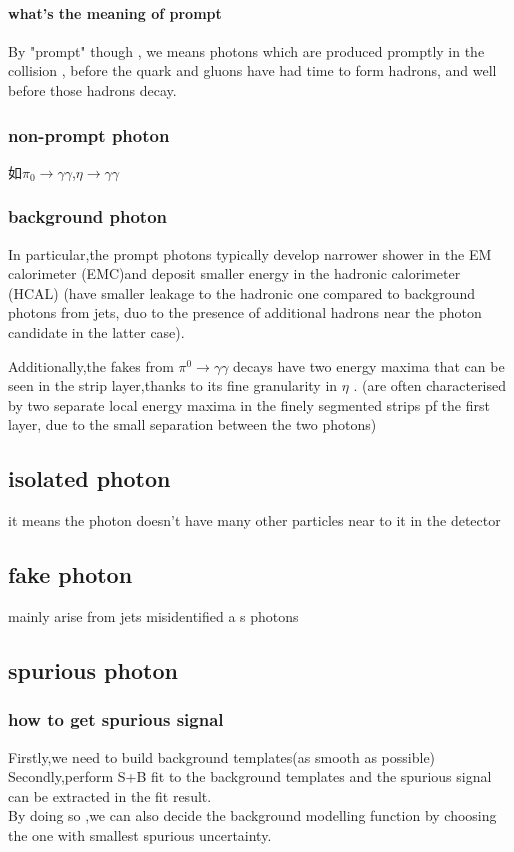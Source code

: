 \documentclass{ctexart}
\begin{document}
\paragraph{what's the meaning of prompt}
By "prompt" though , we means photons which are produced promptly in the collision , before the quark and gluons have had time to form hadrons, and well before those hadrons decay.
\subsubsection{non-prompt photon }
如$\pi_0\rightarrow \gamma\gamma$,$\eta\rightarrow\gamma\gamma$
\subsubsection{background photon}
In particular,the prompt photons typically develop narrower shower in the EM calorimeter (EMC)and deposit smaller energy in the hadronic calorimeter (HCAL) (have smaller leakage to the hadronic one compared to background photons from jets, duo to the presence of additional hadrons near the photon candidate in the latter case).\par
Additionally,the fakes from $\pi^0\rightarrow \gamma\gamma$ decays have two energy maxima that can be seen in the strip layer,thanks to its fine granularity in $\eta$ . (are often characterised by two separate local energy maxima in the finely segmented strips pf the first layer, due to the small separation between the two photons)
\subsection{isolated photon}
it means the photon doesn't have many other particles near to it in the detector


\subsection{fake photon}
mainly arise from jets misidentified a s photons
\subsection{spurious photon}
\subsubsection{how to get spurious signal}
Firstly,we need to build background templates(as smooth as possible)\\
Secondly,perform S+B fit to the background templates and the spurious signal can be extracted in the fit result.\\
By doing so ,we can also decide the background modelling function by choosing the one with smallest spurious uncertainty.
\end{document}
